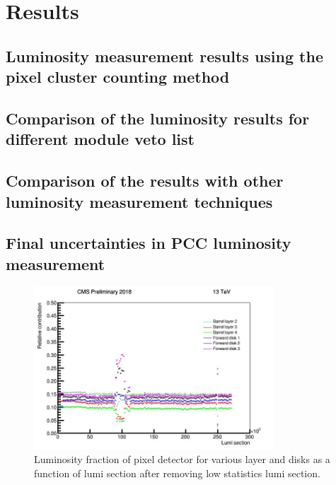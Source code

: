 \chapter{Results}  %

\ifpdf
    \graphicspath{{Chapter1/Figs/Raster/}{Chapter1/Figs/PDF/}{Chapter1/Figs/}}
\else
    \graphicspath{{Chapter1/Figs/Vector/}{Chapter1/Figs/}}
\fi


\section{Luminosity measurement results using the pixel cluster counting method}
\section{Comparison of the luminosity results for different module veto list}
\section{Comparison of the results with other luminosity measurement techniques}
\section{Final uncertainties in PCC luminosity measurement}



\begin{figure}[!htp]
\centering
\includegraphics[width=0.8\textwidth]{ashish_thesis/pixel_layer_disk_noveto_noselection.png}
\caption{%
   Luminosity fraction of pixel detector for various layer and disks as a function of lumi section after removing low statistics lumi section.
}
\label{fig:PCC_stab_begin}
\end{figure}






